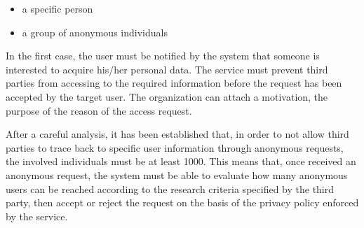 \begin{flushleft}
\begin{itemize}%
	\item a specific person
	\item a group of anonymous individuals
\end{itemize}

In the first case, the user must be notified by the system that someone is interested to acquire his/her personal data. The service must prevent third parties from accessing to the required information before the request has been accepted by the target user. The organization can attach a motivation, the purpose of the reason of the access request.

After a careful analysis, it has been established that, in order to not allow third parties to trace back to specific user information through anonymous requests, the involved individuals must be at least 1000. This means that, once received an anonymous request, the system must be able to evaluate how many anonymous users can be reached according to the research criteria specified by the third party, then accept or reject the request on the basis of the privacy policy enforced by the service. 

{}


\end{flushleft}
